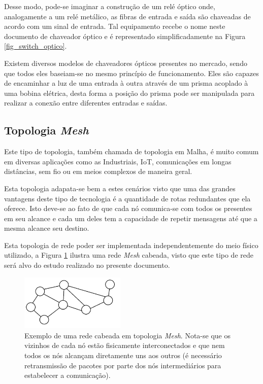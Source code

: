 \documentclass[12pt]{article}
\begin{document}
Desse modo, pode-se imaginar a construção de um relé óptico onde, analogamente a um relé metálico, as fibras de entrada e saída são chaveadas de acordo com um sinal de entrada. Tal equipamento recebe o nome neste documento de chaveador óptico e é representado simplificadamente na Figura \ref{fig_switch_optico}. 

Existem diversos modelos de chaveadores ópticos presentes no mercado, sendo que todos eles baseiam-se no mesmo princípio de funcionamento. Eles são capazes de encaminhar a luz de uma entrada à outra através de um prisma acoplado à uma bobina elétrica, desta forma a posição do prisma pode ser manipulada para realizar a conexão entre diferentes entradas e saídas.

\subsection{Topologia \emph{Mesh}}
Este tipo de topologia, também chamada de topologia em Malha, é muito comum em diversas aplicações como as Industriais, IoT, comunicações em longas distâncias, sem fio ou em meios complexos de maneira geral. 

Esta topologia adapata-se bem a estes cenários visto que uma das grandes vantagens deste tipo de tecnologia é a quantidade de rotas redundantes que ela oferece. Isto deve-se ao fato de que cada nó comunica-se com todos os presentes em seu alcance e cada um deles tem a capacidade de repetir mensagens até que a mesma alcance seu destino. 

Esta topologia de rede poder ser implementada independentemente do meio físico utilizado, a Figura \ref{fig_rede_mesh} ilustra uma rede \emph{Mesh} cabeada, visto que este tipo de rede será alvo do estudo realizado no presente documento.

\begin{figure} %
	\centering
	\includegraphics[width=5cm]{Rede_Mesh}
	\caption{Exemplo de uma rede cabeada em topologia \emph{Mesh}. Nota-se que os vizinhos de cada nó estão fisicamente interconectados e que nem todos os nós alcançam diretamente uns aos outros (é necessário retransmissão de pacotes por parte dos nós intermediários para estabelecer a comunicação).}
	\label{fig_rede_mesh}
\end{figure}
\end{document}

